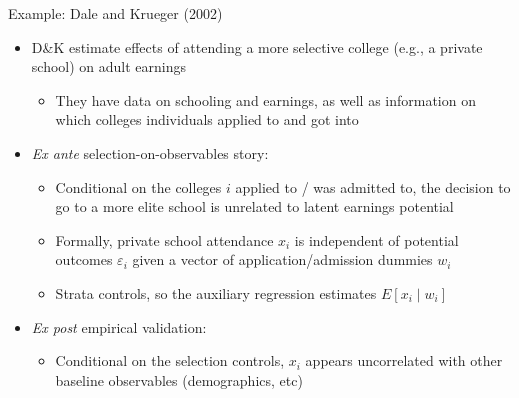 \documentclass[11pt, english]{beamer}
\begin{document}
	\begin{frame}{Example: Dale and Krueger (2002)}
		\begin{itemize}
			\item D\&K estimate effects of attending a more selective college (e.g., a
				private school) on adult earnings
				\smallskip
				\begin{itemize}
					\item They have data on schooling and earnings, as well as information
						on which colleges individuals applied to and got into
				\end{itemize}
				\bigskip
				\pause{}

			\item \emph{Ex ante} selection-on-observables story:
				\smallskip
				\begin{itemize}
					\item Conditional on the colleges $i$ applied to / was admitted to,
						the decision to go to a more elite school is unrelated to latent
						earnings potential
						\smallskip
						\pause{}

					\item Formally, private school attendance $x_{i}$ is independent of
						potential outcomes $\varepsilon_{i}$ given a vector of application/admission
						dummies $w_{i}$
						\smallskip
						\pause{}

					\item Strata controls, so the auxiliary regression estimates
						$E[x_{i}\mid w_{i}]$
				\end{itemize}
				\bigskip
				\pause{}

			\item \emph{Ex post} empirical validation:
				\smallskip
				\begin{itemize}
					\item Conditional on the selection controls, $x_{i}$ appears
						uncorrelated with other baseline observables (demographics, etc)
				\end{itemize}
		\end{itemize}
	\end{frame}
\end{document}
